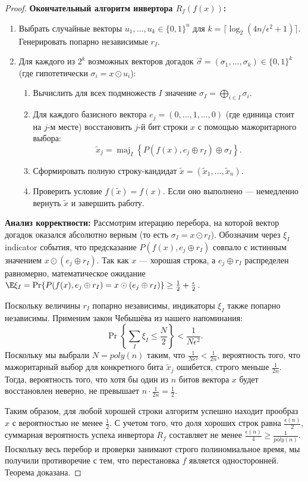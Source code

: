 \begin{proof}
    \textbf{Окончательный алгоритм инвертора $R_f(f(x))$:}
    \begin{enumerate}
        \item Выбрать случайные векторы $u_1, \dots, u_k \in \{0, 1\}^n$ для $k = \lceil \log_2 (4n/\epsilon^2 + 1) \rceil$. Генерировать попарно независимые $r_I$.
        \item Для каждого из $2^k$ возможных векторов догадок $\vec{\sigma} = (\sigma_1, \dots, \sigma_k) \in \{0,1\}^k$ (где гипотетически $\sigma_i = x \odot u_i$):
        \begin{enumerate}
            \item Вычислить для всех подмножеств $I$ значение $\sigma_I = \bigoplus_{i \in I} \sigma_i$.
            \item Для каждого базисного вектора $e_j = (0, \dots, 1, \dots, 0)$ (где единица стоит на $j$-м месте) восстановить $j$-й бит строки $x$ с помощью мажоритарного выбора:
            \[ \tilde{x}_j = \operatorname{maj}_{I} \left\{ P(f(x), e_j \oplus r_I) \oplus \sigma_I \right\}. \]
            \item Сформировать полную строку-кандидат $\tilde{x} = (\tilde{x}_1, \dots, \tilde{x}_n)$.
            \item Проверить условие $f(\tilde{x}) = f(x)$. Если оно выполнено — немедленно вернуть $\tilde{x}$ и завершить работу.
        \end{enumerate}
    \end{enumerate}

    \textbf{Анализ корректности:}
    Рассмотрим итерацию перебора, на которой вектор догадок оказался абсолютно верным (то есть $\sigma_I = x \odot r_I$). Обозначим через $\xi_I$ indicator события, что предсказание $P(f(x), e_j \oplus r_I)$ совпало с истинным значением $x \odot (e_j \oplus r_I)$. Так как $x$ — хорошая строка, а $e_j \oplus r_I$ распределен равномерно, математическое ожидание $\E \xi_I = \Pr\{P(f(x), e_j \oplus r_I) = x \odot (e_j \oplus r_I)\} \ge \frac{1}{2} + \frac{\epsilon}{2}$.

    Поскольку величины $r_I$ попарно независимы, индикаторы $\xi_I$ также попарно независимы. Применим закон Чебышёва из нашего напоминания:
    \[ \Pr\left\{ \sum_{I} \xi_I \le \frac{N}{2} \right\} < \frac{1}{N \epsilon^2}. \]
    Поскольку мы выбрали $N = poly(n)$ таким, что $\frac{1}{N\epsilon^2} < \frac{1}{2n}$, вероятность того, что мажоритарный выбор для конкретного бита $\tilde{x}_j$ ошибется, строго меньше $\frac{1}{2n}$. Тогда, вероятность того, что хотя бы один из $n$ битов вектора $x$ будет восстановлен неверно, не превышает $n \cdot \frac{1}{2n} = \frac{1}{2}$.

    Таким образом, для любой хорошей строки алгоритм успешно находит прообраз $x$ с вероятностью не менее $\frac{1}{2}$. С учетом того, что доля хороших строк равна $\frac{\epsilon(n)}{2}$, суммарная вероятность успеха инвертора $R_f$ составляет не менее $\frac{\epsilon(n)}{4} \ge \frac{1}{poly(n)}$. Поскольку весь перебор и проверки занимают строго полиномиальное время, мы получили противоречие с тем, что перестановка $f$ является односторонней. Теорема доказана.
\end{proof}


